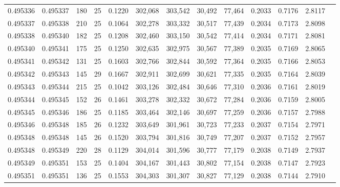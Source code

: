 \begin{tabular}{rrrrrrrrrrrrr}
0.495336 & 0.495337 & 180 &  25 &                                     0.1220 & 302,068 & 303,542 &  30,492 &  77,464 & 0.2033 & 0.7176 & 2.8117 \\
0.495337 & 0.495338 & 210 &  25 &                                     0.1064 & 302,278 & 303,332 &  30,517 &  77,439 & 0.2034 & 0.7173 & 2.8098 \\
0.495338 & 0.495340 & 182 &  25 &                                     0.1208 & 302,460 & 303,150 &  30,542 &  77,414 & 0.2034 & 0.7171 & 2.8081 \\
0.495340 & 0.495341 & 175 &  25 &                                     0.1250 & 302,635 & 302,975 &  30,567 &  77,389 & 0.2035 & 0.7169 & 2.8065 \\
0.495341 & 0.495342 & 131 &  25 &                                     0.1603 & 302,766 & 302,844 &  30,592 &  77,364 & 0.2035 & 0.7166 & 2.8053 \\
0.495342 & 0.495343 & 145 &  29 &                                     0.1667 & 302,911 & 302,699 &  30,621 &  77,335 & 0.2035 & 0.7164 & 2.8039 \\
0.495343 & 0.495344 & 215 &  25 &                                     0.1042 & 303,126 & 302,484 &  30,646 &  77,310 & 0.2036 & 0.7161 & 2.8019 \\
0.495344 & 0.495345 & 152 &  26 &                                     0.1461 & 303,278 & 302,332 &  30,672 &  77,284 & 0.2036 & 0.7159 & 2.8005 \\
0.495345 & 0.495346 & 186 &  25 &                                     0.1185 & 303,464 & 302,146 &  30,697 &  77,259 & 0.2036 & 0.7157 & 2.7988 \\
0.495346 & 0.495348 & 185 &  26 &                                     0.1232 & 303,649 & 301,961 &  30,723 &  77,233 & 0.2037 & 0.7154 & 2.7971 \\
0.495348 & 0.495348 & 145 &  26 &                                     0.1520 & 303,794 & 301,816 &  30,749 &  77,207 & 0.2037 & 0.7152 & 2.7957 \\
0.495348 & 0.495349 & 220 &  28 &                                     0.1129 & 304,014 & 301,596 &  30,777 &  77,179 & 0.2038 & 0.7149 & 2.7937 \\
0.495349 & 0.495351 & 153 &  25 &                                     0.1404 & 304,167 & 301,443 &  30,802 &  77,154 & 0.2038 & 0.7147 & 2.7923 \\
0.495351 & 0.495351 & 136 &  25 &                                     0.1553 & 304,303 & 301,307 &  30,827 &  77,129 & 0.2038 & 0.7144 & 2.7910 \\

\end{tabular}
